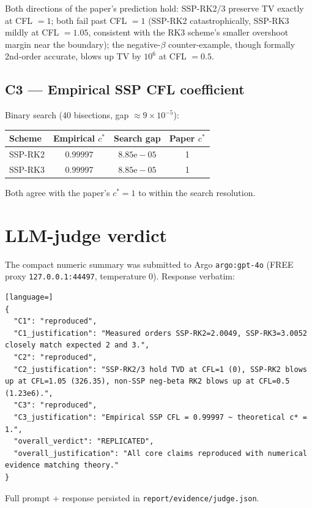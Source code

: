 \documentclass[11pt]{article}
\begin{document}
Both directions of the paper's prediction hold: SSP-RK2/3 preserve TV
exactly at CFL $=1$; both fail past CFL $=1$ (SSP-RK2 catastrophically,
SSP-RK3 mildly at CFL $=1.05$, consistent with the RK3 scheme's smaller
overshoot margin near the boundary); the negative-$\beta$ counter-example,
though formally 2nd-order accurate, blows up TV by $10^{6}$ at CFL $=0.5$.

\subsection{C3 --- Empirical SSP CFL coefficient}

Binary search (40 bisections, gap $\approx 9\times 10^{-5}$):
\begin{center}
\begin{tabular}{lccc}
\toprule
Scheme & Empirical $c^{\ast}$ & Search gap & Paper $c^{\ast}$\\
\midrule
SSP-RK2 & $\mathbf{0.99997}$ & $8.85\mathrm{e}{-}05$ & 1\\
SSP-RK3 & $\mathbf{0.99997}$ & $8.85\mathrm{e}{-}05$ & 1\\
\bottomrule
\end{tabular}
\end{center}

Both agree with the paper's $c^{\ast} = 1$ to within the search resolution.

\section{LLM-judge verdict}

The compact numeric summary was submitted to Argo \texttt{argo:gpt-4o}
(FREE proxy \texttt{127.0.0.1:44497}, temperature 0). Response verbatim:

\begin{lstlisting}[language=]
{
  "C1": "reproduced",
  "C1_justification": "Measured orders SSP-RK2=2.0049, SSP-RK3=3.0052 closely match expected 2 and 3.",
  "C2": "reproduced",
  "C2_justification": "SSP-RK2/3 hold TVD at CFL=1 (0), SSP-RK2 blows up at CFL=1.05 (326.35), non-SSP neg-beta RK2 blows up at CFL=0.5 (1.23e6).",
  "C3": "reproduced",
  "C3_justification": "Empirical SSP CFL = 0.99997 ~ theoretical c* = 1.",
  "overall_verdict": "REPLICATED",
  "overall_justification": "All core claims reproduced with numerical evidence matching theory."
}
\end{lstlisting}

Full prompt + response persisted in \texttt{report/evidence/judge.json}.
\end{document}

